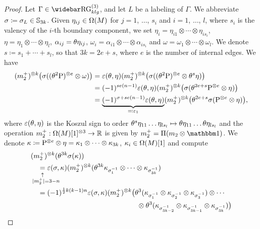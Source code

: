 \documentclass[\MainFolder/Text.tex]{subfiles}
\begin{document}
\begin{proof}
Let $\Gamma\in \TRRG_{klg}$, and let $L$ be a labeling of $\Gamma$. We abbreviate $\sigma\coloneqq \sigma_L \in \mathbb{S}_{3k} $. Given $\eta_{ij}\in \Omega(M)$ for $j=1$, $\dotsc$, $s_i$ and $i=1$, $\dotsc$, $l$, where $s_i$ is the valency of the $i$-th boundary component, we set $\eta_i = \eta_{i1}\otimes \dotsb \otimes \eta_{is_i}$, $\eta =\eta_1 \otimes \dotsb \otimes \eta_l$, $\alpha_{ij}=\theta \eta_{ij}$, $\omega_i = \alpha_{i1}\otimes \dotsb \otimes \alpha_{i s_i}$ and $\omega = \omega_1\otimes \dotsb \otimes \omega_l$. We denote $s \coloneqq s_1 + \dotsb + s_l$, so that $3k = 2e + s$, where $e$ is the number of internal edges. We have
\begin{align*}(m_2^+)^{\otimes k} \bigl(\sigma((\theta^{ 2} \mathrm{P})^{\otimes e} \otimes \omega)\bigr) &= \varepsilon(\theta,\eta)(m_2^+)^{\otimes k} \bigl(\sigma((\theta^{ 2} \mathrm{P})^{\otimes e} \otimes \theta^{s} \eta)\bigr) \\
& = (-1)^{s e (n-1)}\varepsilon(\theta,\eta)(m_2^+)^{\otimes k} \bigl(\sigma(\theta^{2e+s}\mathrm{P}^{\otimes e} \otimes \eta)\bigr) \\
&= \underbrace{(-1)^{\sigma + s e (n-1)} \varepsilon(\theta,\eta) }_{\eqqcolon \varepsilon_1}(m_2^+)^{\otimes k} \bigl(\theta^{2e+s} \sigma( \mathrm{P}^{\otimes e} \otimes \eta)\bigr),
\end{align*}
where $\varepsilon(\theta,\eta)$ is the Koszul sign to order $\theta^s \eta_{11}\dots\eta_{l s_l} \mapsto \theta\eta_{11} \dots \theta \eta_{l s_l}$ and the operation $m_2^+: \Omega(M)[1]^{\otimes 3} \rightarrow \mathbb{R}$ is given by $m_2^+ = \Pair(m_2 \otimes \Id)$. We denote $\kappa \coloneqq \mathrm{P}^{\otimes e} \otimes \eta = \kappa_1 \otimes \dotsb \otimes \kappa_{3k}$, $\kappa_i \in \Omega(M)[1]$ and compute
\begin{align*}
 & (m_2^+)^{\otimes k} (\SuspU^{3k} \sigma(\kappa)) \\
 &\quad \underset{\mathclap{\substack{\uparrow\rule{0pt}{1.7ex} \\ \ \ \ \Abs{m_2^+} = 3 - n}}}{=} \varepsilon(\sigma, \kappa) (m_2^+)^{\otimes k} (\SuspU^{3k} \kappa_{\sigma_1^{-1}} \otimes \dotsb \otimes \kappa_{\sigma_{3k}^{-1}})  \\
 & \quad = \begin{multlined}[t] (-1)^{\frac{1}{2}k(k-1)n}\varepsilon(\sigma,\kappa) (m_2^+)^{\otimes k}\bigl(\SuspU^3(\kappa_{\sigma_1^{-1}} \otimes \kappa_{\sigma_2^{-1}} \otimes \kappa_{\sigma_3^{-1}}) \otimes \dotsb \\ \otimes \SuspU^3(\kappa_{\sigma_{3k-2}^{-1}} \otimes \kappa_{\sigma_{3k-1}^{-1}} \otimes \kappa_{\sigma_{3k}^{-1}}) \bigr)\end{multlined}\\

\end{align*}
\end{proof}
\end{document}
